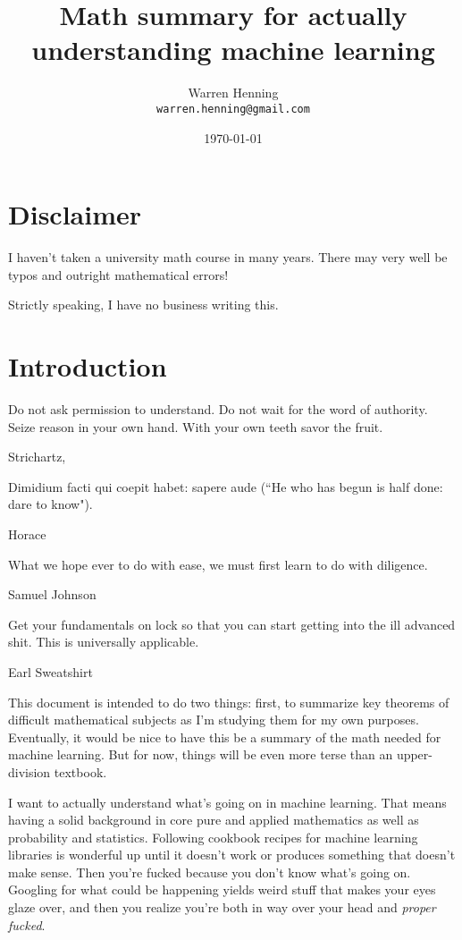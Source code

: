 \documentclass{article}
\theoremstyle{definition}
\begin{document}
\title{Math summary for actually understanding machine learning}
\author{Warren Henning\\\texttt{warren.henning@gmail.com}}
\date{\today}

\maketitle

\tableofcontents

\pagebreak

\section{Disclaimer}

I haven't taken a university math course in many years. There may very well
be typos and outright mathematical errors!

Strictly speaking, I have no business writing this.

\section{Introduction}

\epigraph{Do not ask permission to understand. Do not wait for the word of authority. Seize reason in your own hand. With your own teeth savor the fruit.}{Strichartz, \cite{strichartz}}

\epigraph{Dimidium facti qui coepit habet: sapere aude (``He who has begun is half done: dare to know").}{Horace}

\epigraph{What we hope ever to do with ease, we must first learn to do with diligence.}{Samuel Johnson}

\epigraph{Get your fundamentals on lock so that you can start getting into the ill advanced shit. This is universally applicable.}{Earl Sweatshirt}

This document is intended to do two things: first, to summarize key theorems of difficult mathematical subjects as I'm studying them for my own purposes. Eventually, it would be nice to have this be a summary of the math needed for machine learning. But for now, things will be even more terse than an upper-division textbook.

I want to actually understand what's going on in machine learning. That means having a solid background in core pure and applied mathematics as well as probability and statistics. Following cookbook recipes for machine learning libraries is wonderful up until it doesn't work or produces something that doesn't make sense. Then you're fucked because you don't know what's going on. Googling for what could be happening yields weird stuff that makes your eyes glaze over, and then you realize you're both in way over your head and \emph{proper fucked}.
\end{document}
